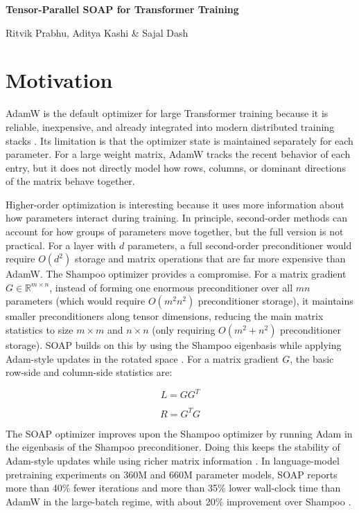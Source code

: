 \documentclass[10pt]{article}
\begin{document}
\begin{center}
{\Large \textbf{Tensor-Parallel SOAP for Transformer Training}}\
\vspace{0.25em}
\end{center}
\begin{center}
{ Ritvik Prabhu, Aditya Kashi \& Sajal Dash}\
\end{center}

\section{Motivation}

AdamW is the default optimizer for large Transformer training because it is reliable, inexpensive, and already integrated into modern distributed training stacks \cite{kingma2014adam,loshchilov2019decoupled}. Its limitation is that the optimizer state is maintained separately for each parameter. For a large weight matrix, AdamW tracks the recent behavior of each entry, but it does not directly model how rows, columns, or dominant directions of the matrix behave together.

Higher-order optimization is interesting because it uses more information about how parameters interact during training. In principle, second-order methods can account for how groups of parameters move together, but the full version is not practical. For a layer with $d$ parameters, a full second-order preconditioner would require $O(d^2)$ storage and matrix operations that are far more expensive than AdamW. The Shampoo optimizer provides a compromise. For a matrix gradient $G \in \mathbb{R}^{m \times n}$, instead of forming one enormous preconditioner over all $mn$ parameters (which would require $O(m^2n^2)$ preconditioner storage), it maintains smaller preconditioners along tensor dimensions, reducing the main matrix statistics to size $m \times m$ and $n \times n$ (only requiring $O(m^2+n^2)$ preconditioner storage)\cite{gupta2018shampoo,anil2020scalable}. SOAP builds on this by using the Shampoo eigenbasis while applying Adam-style updates in the rotated space \cite{vyas2024soap}. For a matrix gradient $G$, the basic row-side and column-side statistics are:

$$
L = GG^T
$$

$$
R = G^TG
$$

The SOAP optimizer improves upon the Shampoo optimizer by running Adam in the eigenbasis of the Shampoo preconditioner. Doing this keeps the stability of Adam-style updates while using richer matrix information \cite{vyas2024soap}. In language-model pretraining experiments on 360M and 660M parameter models, SOAP reports more than 40\% fewer iterations and more than 35\% lower wall-clock time than AdamW in the large-batch regime, with about 20\% improvement over Shampoo \cite{vyas2024soap}. 
\end{document}
